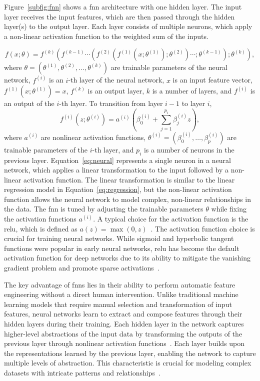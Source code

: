 Figure~\ref{subfig:fnn} shows a \gls{fnn} architecture with one hidden layer.
The input layer receives the input features, which are then passed through the hidden layer(s) to the output layer.
Each layer consists of multiple neurons, which apply a non-linear activation function to the weighted sum of the inputs.

\begin{equation} \label{eq:fnn}
    f(x; \theta) = f^{(k)}(f^{(k-1)} \cdots (f^{(2)}(f^{(1)}(x;\theta^{(1)});\theta^{(2)} )\cdots ;\theta^{(k-1)});\theta^{(k)}),
\end{equation}
where $\theta = (\theta^{(1)}, \theta^{(2)}, \ldots, \theta^{(k)})$ are trainable parameters of the neural network, $f^{(i)}$ is an $i$-th layer of the neural network, $x$ is an input feature vector, $f^{(1)}(x;\theta^{(1)}) = x$, $f^{(k)}$ is an output layer, $k$ is a number of layers, and $f^{(i)}$ is an output of the $i$-th layer.
To transition from layer $i-1$ to layer $i$,
\begin{equation} \label{eq:neural}
    f^{(i)}(z;\theta^{(i)}) = a^{(i)}(\beta_0^{(i)} + \sum_{j=1}^{p_i} \beta_j^{(i)} z),
\end{equation}
where $a^{(i)}$ are nonlinear activation functions, $\theta^{(i)} = (\beta_0^{(i)}, \dots, \beta_p^{(i)})$ are trainable parameters of the $i$-th layer, and $p_i$ is a number of neurons in the previous layer.
Equation~\eqref{eq:neural} represents a single neuron in a neural network, which applies a linear transformation to the input followed by a non-linear activation function.
The linear transformation is similar to the linear regression model in Equation~\eqref{eq:regression}, but the non-linear activation function allows the neural network to model complex, non-linear relationships in the data.
The \gls{fnn} is tuned by adjusting the trainable parameters $\theta$ while fixing the activation functions $a^{(i)}$.
A typical choice for the activation function is the \gls{relu}, which is defined as $a(z) = \max(0, z)$~\citep{nair2010rectified}.
The activation function choice is crucial for training neural networks.
While sigmoid and hyperbolic tangent functions were popular in early neural networks, \gls{relu} has become the default activation function for deep networks due to its ability to mitigate the vanishing gradient problem and promote sparse activations~\citep{lecun2015deep}.

The key advantage of \gls{fnn}s lies in their ability to perform automatic feature engineering without a direct human intervention.
Unlike traditional machine learning models that require manual selection and transformation of input features, neural networks learn to extract and compose features through their hidden layers during their training.
Each hidden layer in the network captures higher-level abstractions of the input data by transforming the outputs of the previous layer through nonlinear activation functions~\citep{lecun2015deep}.
Each layer builds upon the representations learned by the previous layer, enabling the network to capture multiple levels of abstraction.
This characteristic is crucial for modeling complex datasets with intricate patterns and relationships~\citep{bengio2013representation}.

